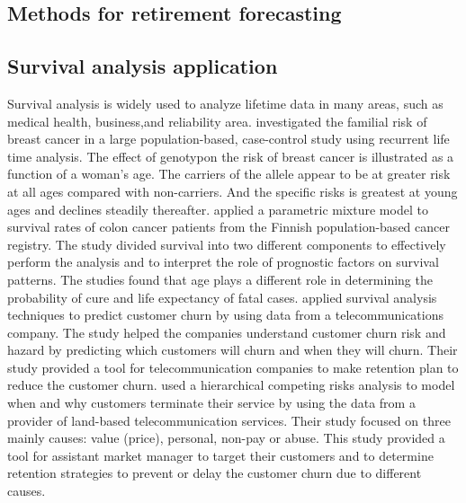 \documentclass[12pt,letterpaper]{article}
\begin{document}

\subsection{Methods for retirement forecasting}
\subsection{Survival analysis application}
Survival analysis is widely used to analyze lifetime data in many areas, such as medical health, business,and reliability area.
\citet{claus1991} investigated the familial risk of breast cancer in a large population-based, case-control study using recurrent life time analysis. The effect of genotypon the risk of breast cancer is illustrated as a function of a woman's age. The carriers of the allele appear to be at greater risk at all ages compared with non-carriers. And the specific risks is greatest at young ages and declines steadily thereafter. 
\citet{de1999} applied a parametric mixture model to survival rates of colon cancer patients from the Finnish population-based  cancer registry. The study divided survival into two different components to effectively perform the analysis and to interpret the role of prognostic factors on survival patterns. The studies found that age plays a different role in determining the probability of cure and life expectancy of fatal cases. 
\citet{lu2002} applied survival analysis techniques to predict customer churn by using data from a telecommunications company. The study helped the companies understand customer churn risk and hazard by predicting which customers will churn and when they will churn. Their study provided a tool for telecommunication companies to make retention plan to reduce the customer churn.
\citet{braun2011} used a hierarchical competing risks analysis to model when and why customers terminate their service by using the data from a provider of land-based telecommunication services. Their study focused on three mainly causes: value (price), personal, non-pay or abuse. %
This study provided a tool for assistant market manager to target their customers and to determine retention strategies to prevent or delay the customer churn due to different causes.
\end{document}
